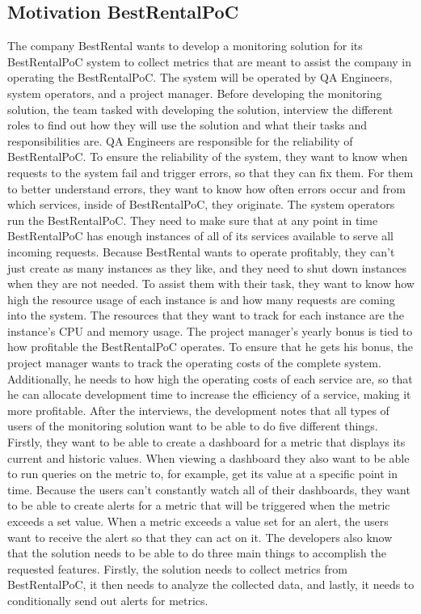 \subsection{Motivation BestRentalPoC}
The company BestRental wants to develop a monitoring solution for its BestRentalPoC system
to collect metrics that are meant to assist the company in operating the BestRentalPoC.
The system will be operated by QA Engineers, system operators, and a project manager.
Before developing the monitoring solution, the team tasked with developing the solution,
interview the different roles to find out how they will use the solution
and what their tasks and responsibilities are.
QA Engineers are responsible for the reliability of BestRentalPoC.
To ensure the reliability of the system, they want to know when requests to the system fail and
trigger errors, so that they can fix them.
For them to better understand errors, they want to know how often errors occur and from which services,
inside of BestRentalPoC, they originate.
The system operators run the BestRentalPoC. They need to make sure that at any point in time
BestRentalPoC has enough instances of all of its services available to serve all incoming requests.
Because BestRental wants to operate profitably, they can't just create as many instances as they like,
and they need to shut down instances when they are not needed.
To assist them with their task, they want to know how high the resource usage of each instance is
and how many requests are coming into the system. The resources that they want to track for each
instance are the instance's CPU and memory usage.
The project manager's yearly bonus is tied to how profitable the BestRentalPoC operates.
To ensure that he gets his bonus, the project manager wants to track the operating costs of the complete system.
Additionally, he needs to how high the operating costs of each service are, so that he can
allocate development time to increase the efficiency of a service, making it more profitable.
After the interviews, the development notes that all types of users of the monitoring solution
want to be able to do five different things.
Firstly, they want to be able to create a dashboard for a metric that displays its current and historic values.
When viewing a dashboard they also want to be able to run queries on the metric to, for example, get
its value at a specific point in time.
Because the users can't constantly watch all of their dashboards, they want to be able to create
alerts for a metric that will be triggered when the metric exceeds a set value.
When a metric exceeds a value set for an alert, the users want to receive the alert so that they can act on it.
The developers also know that the solution needs to be able to do three main things to accomplish
the requested features.
Firstly, the solution needs to collect metrics from BestRentalPoC,
it then needs to analyze the collected data, and lastly, it needs to conditionally send out alerts
for metrics.


